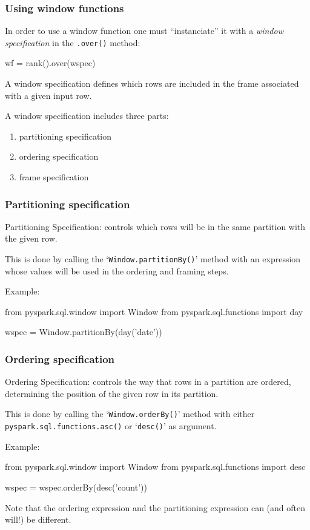 \documentclass[english,serif,mathserif]{beamer}
\begin{document}
\begin{frame}[fragile]
  \frametitle{Using window functions}

  In order to use a window function one must ``instanciate'' it with a
  \emph{window specification} in the \texttt{.over()} method:
  \begin{python}
wf = rank().over(wspec)
  \end{python}

  \+
  A window specification defines which rows are included in the frame associated
  with a given input row.

  \+
  A window specification includes three parts:
  \begin{enumerate}
  \item partitioning specification
  \item ordering specification
  \item frame specification
  \end{enumerate}
\end{frame}


\begin{frame}[fragile]
  \frametitle{Partitioning specification}
  Partitioning Specification: controls which rows will be in the same partition
  with the given row.

  \+
  This is done by calling the `\texttt{Window.partitionBy()}' method with an
  expression whose values will be used in the ordering and framing steps.

  \+
  Example:
  \begin{python}
    from pyspark.sql.window import Window
    from pyspark.sql.functions import day

    wspec = Window.partitionBy(day('date'))
  \end{python}
\end{frame}


\begin{frame}[fragile]
  \frametitle{Ordering specification}
  Ordering Specification: controls the way that rows in a partition are ordered,
  determining the position of the given row in its partition.

  \+
  This is done by calling the `\texttt{Window.orderBy()}' method with either
  \texttt{pyspark.sql.functions.asc()} or `\texttt{desc()}' as argument.

  \+
  Example:
  \begin{python}
    from pyspark.sql.window import Window
    from pyspark.sql.functions import desc

    wspec = wspec.orderBy(desc('count'))
  \end{python}

  \+
  Note that the ordering expression and the partitioning expression can (and
  often will!) be different.
\end{frame}
\end{document}
